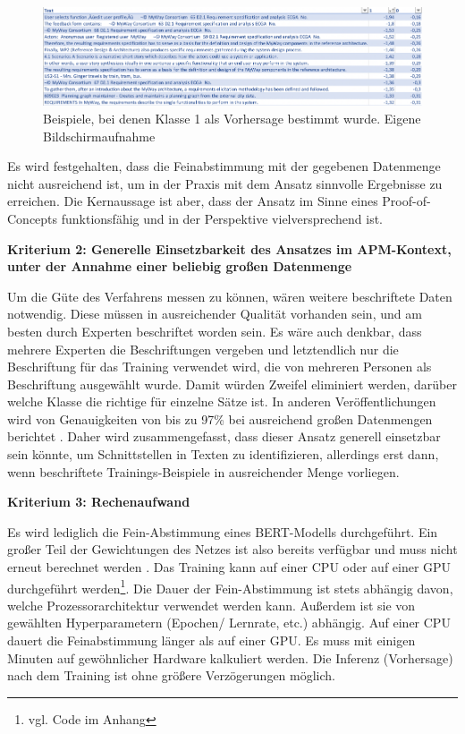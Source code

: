 \begin{figure}[h]
\centering
\includegraphics[scale=0.95]{content/pics/Picture_26.png}
\caption{Beispiele, bei denen Klasse 1 als Vorhersage bestimmt wurde. Eigene Bildschirmaufnahme}
\label{Abbildung:bert-1}
\end{figure}

Es wird festgehalten, dass die Feinabstimmung mit der gegebenen Datenmenge nicht ausreichend ist, um in der Praxis mit dem Ansatz sinnvolle Ergebnisse zu erreichen. Die Kernaussage ist aber, dass der Ansatz im Sinne eines Proof-of-Concepts funktionsfähig und in der Perspektive vielversprechend ist.

{\bf Kriterium 2: Generelle Einsetzbarkeit des Ansatzes im APM-Kontext, unter der Annahme einer beliebig großen Datenmenge}

Um die Güte des Verfahrens messen zu können, wären weitere beschriftete Daten notwendig. Diese müssen in ausreichender Qualität vorhanden sein, und am besten durch Experten beschriftet worden sein. Es wäre auch denkbar, dass mehrere Experten die Beschriftungen vergeben und letztendlich nur die Beschriftung für das Training verwendet wird, die von mehreren Personen als Beschriftung ausgewählt wurde. Damit würden Zweifel eliminiert werden, darüber welche Klasse die richtige für einzelne Sätze ist. In anderen Veröffentlichungen wird von Genauigkeiten von bis zu 97\% bei ausreichend großen Datenmengen berichtet \cite{Tang}. Daher wird zusammengefasst, dass dieser Ansatz generell einsetzbar sein könnte, um Schnittstellen in Texten zu identifizieren, allerdings erst dann, wenn beschriftete Trainings-Beispiele in ausreichender Menge vorliegen.

{\bf Kriterium 3: Rechenaufwand}

Es wird lediglich die Fein-Abstimmung eines BERT-Modells durchgeführt. Ein großer Teil der Gewichtungen des Netzes ist also bereits verfügbar und muss nicht erneut berechnet werden \cite{bert}.
Das Training kann auf einer CPU oder auf einer GPU durchgeführt werden\footnote{vgl. Code im Anhang}. Die Dauer der Fein-Abstimmung ist stets abhängig davon, welche Prozessorarchitektur verwendet werden kann. Außerdem ist sie von gewählten Hyperparametern (Epochen/ Lernrate, etc.) abhängig. Auf einer CPU dauert die Feinabstimmung länger als auf einer GPU. Es muss mit einigen Minuten auf gewöhnlicher Hardware kalkuliert werden. Die Inferenz (Vorhersage) nach dem Training ist ohne größere Verzögerungen möglich.

